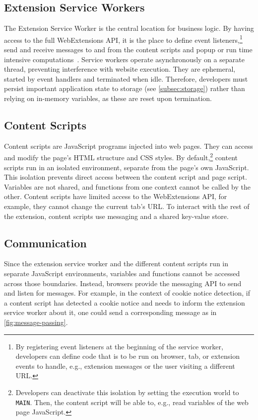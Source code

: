 \subsection{Extension Service Workers} \label{subsec:service-workers}
The Extension Service Worker is the central location for business logic.
By having access to the full WebExtensions API, it is the place to define event listeners,\footnote{
By registering event listeners at the beginning of the service worker, developers can define code that is to be run on browser, tab, or extension events to handle, e.g., extension messages or the user visiting a different URL.}
send and receive messages to and from the content scripts and popup
or run time intensive computations~\cite[Ch. 4]{frisbie2023browser}.
Service workers operate asynchronously on a separate thread, preventing interference with website execution. 
They are ephemeral, started by event handlers and terminated when idle.
Therefore, developers must persist important application state to storage (see \cref{subsec:storage}) rather than relying on in-memory variables, as these are reset upon termination.

\subsection{Content Scripts} \label{subsec:content-scripts}
Content scripts are JavaScript programs injected into web pages. 
They can access and modify the page's HTML structure and CSS styles.
By default,\footnote{
Developers can deactivate this isolation by setting the execution world to \texttt{MAIN}. Then, the content script will be able to, e.g., read variables of the web page JavaScript.
} content scripts run in an isolated environment, separate from the page's own JavaScript.
This isolation prevents direct access between the content script and page script.
Variables are not shared, and functions from one context cannot be called by the other.
Content scripts have limited access to the WebExtensions API, for example, they cannot change the current tab's URL.
To interact with the rest of the extension, content scripts use messaging and a shared key-value store.

\subsection{Communication}
Since the extension service worker and the different content scripts run in separate JavaScript environments, variables and functions cannot be accessed across those boundaries.
Instead, browsers provide the messaging API to send and listen for messages.
For example, in the context of cookie notice detection, if a content script has detected a cookie notice and needs to inform the extension service worker about it, one could send a corresponding message as in \cref{fig:message-passing}.

